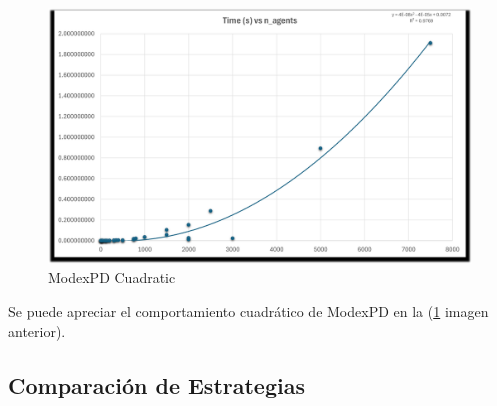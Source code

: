 \documentclass[letterpaper,10pt]{article}
\begin{document}
\begin{figure}[H]
  \centering
  \begin{minipage}{1\textwidth}
    \centering
    \includegraphics[width=\textwidth]{Images/modexpdcomplexity.png}
  \end{minipage}
  \caption{ModexPD Cuadratic} 
  \label{fig:modexpdcomplexity}
\end{figure}
Se puede apreciar el comportamiento cuadrático de ModexPD en la (\ref{fig:modexpdcomplexity} imagen anterior).
\subsection{Comparación de Estrategias}
\end{document}
